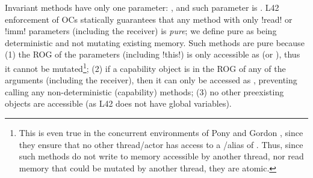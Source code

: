 \label{s:purity}
Invariant methods have only one parameter: \Q@this@, and such parameter is \Q@read@.
L42 enforcement of OCs statically guarantees that any method with only \Q!read! or \Q!imm! parameters (including the receiver) is \emph{pure}; we define pure
as being deterministic and not mutating existing memory. Such methods are pure because
(1) the ROG of the parameters (including \Q!this!) is only accessible as \Q@read@ (or \Q@imm@), thus it cannot be mutated\footnote{This is even true in the concurrent environments of Pony and Gordon \etal, since they ensure that no other thread/actor has access to a \Q@mut@/\Q@capsule@ alias of \Q@this@. 
	Thus, since such methods do not write to memory accessible by another thread, nor read memory that could be mutated by another thread, they are atomic.};
(2) if a capability object is in the ROG of any of the arguments (including the receiver), then it can only be accessed as \Q@read@, preventing calling any 
non-deterministic (capability) methods;
(3) no other preexisting objects are accessible (as L42 does not have global variables). 



